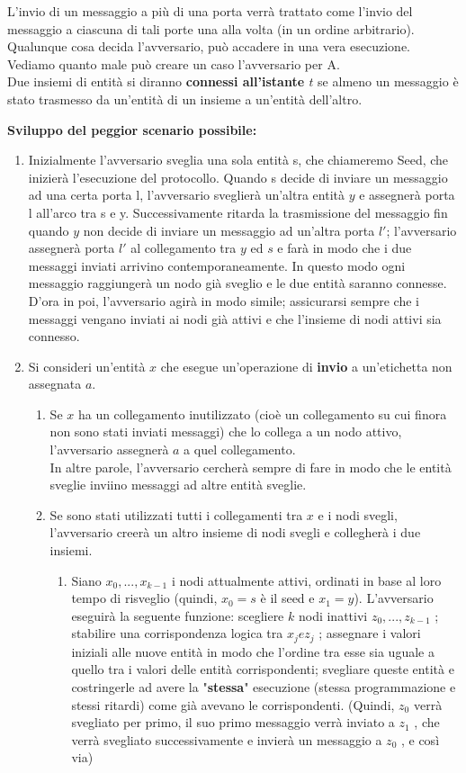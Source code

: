 L'invio di un messaggio a più di una porta verrà trattato come l'invio del messaggio a ciascuna di tali porte una alla volta (in un ordine arbitrario).\\
Qualunque cosa decida l'avversario, può accadere in una vera esecuzione. Vediamo quanto male può creare un caso l'avversario per A.\\
Due insiemi di entità si diranno \textbf{connessi all'istante $t$} se almeno un messaggio è stato trasmesso da un'entità di un insieme a un'entità dell'altro.

\textbf{Sviluppo del peggior scenario possibile:}
\begin{enumerate}
    \item Inizialmente l'avversario sveglia una sola entità s, che chiameremo Seed, che inizierà l'esecuzione del protocollo. Quando s decide di inviare un messaggio ad una certa porta l, l'avversario sveglierà un'altra entità $y$ e assegnerà porta l all'arco tra s e y. Successivamente ritarda la trasmissione del messaggio fin quando $y$ non decide di inviare un messaggio ad un'altra porta $l'$; l'avversario assegnerà porta $l'$ al collegamento tra $y$ ed $s$ e farà in modo che i due messaggi inviati arrivino contemporaneamente. In questo modo ogni messaggio raggiungerà un nodo già sveglio e le due entità saranno connesse.\\
    D'ora in poi, l'avversario agirà in modo simile; assicurarsi sempre che i messaggi vengano inviati ai nodi già attivi e che l'insieme di nodi attivi sia connesso.
    \item Si consideri un'entità $x$ che esegue un'operazione di \textbf{invio} a un'etichetta non assegnata $a$.
    \begin{enumerate}
        \item Se $x$ ha un collegamento inutilizzato (cioè un collegamento su cui finora non sono stati inviati messaggi) che lo collega a un nodo attivo, l'avversario assegnerà $a$ a quel collegamento.\\
        In altre parole, l'avversario cercherà sempre di fare in modo che le entità sveglie inviino messaggi ad altre entità sveglie.
        \item Se sono stati utilizzati tutti i collegamenti tra $x$ e i nodi svegli, l'avversario creerà un altro insieme di nodi svegli e collegherà i due insiemi. 
        \begin{enumerate}
            \item Siano $x_0 , . . . , x_{k-1}$ i nodi attualmente attivi, ordinati in base al loro tempo di risveglio (quindi, $x_0 = s$ è il seed e $x_1 = y$). L'avversario eseguirà la seguente funzione: scegliere $k$ nodi inattivi $z_0 , . . . , z_{k-1}$ ; stabilire una corrispondenza logica tra $x_j e z_j$ ; assegnare i valori iniziali alle nuove entità in modo che l'ordine tra esse sia uguale a quello tra i valori delle entità corrispondenti; svegliare queste entità e costringerle ad avere la "\textbf{stessa}" esecuzione (stessa programmazione e stessi ritardi) come già avevano le corrispondenti. (Quindi, $z_0$ verrà svegliato per primo, il suo primo messaggio verrà inviato a $z_1$ , che verrà svegliato successivamente e invierà un messaggio a $z_0$ , e così via)

\end{enumerate}
\end{enumerate}
\end{enumerate}
